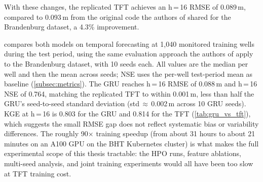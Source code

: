 With these changes, the replicated TFT achieves an h\,=\,16 RMSE of 0.089\,m,
compared to 0.093\,m from the original code the authors of \citet{kunz2025} shared
for the Brandenburg dataset, a 4.3\% improvement.

 compares both models on temporal forecasting at 1{,}040 monitored
training wells during the test period, using the same evaluation approach the authors of
\citet{kunz2025} apply to the Brandenburg dataset, with 10 seeds each. All values are
the median per well and then the mean across seeds; NSE uses the per-well test-period
mean as baseline (\cref{subsec:metrics}). The GRU reaches h\,=\,16 RMSE of 0.088\,m
and h\,=\,16 NSE of 0.764, matching the replicated TFT to within 0.001\,m, less than half
the GRU's seed-to-seed standard deviation (std\,$\approx$\,0.002\,m across 10 GRU seeds).
KGE at h\,=\,16 is 0.803 for the GRU and 0.814 for the TFT (\cref{tab:gru_vs_tft}),
which suggests the small RMSE gap does not reflect systematic bias or variability differences.
The roughly
90$\times$ training speedup (from about 31 hours to about 21 minutes on an A100 GPU on
the BHT Kubernetes cluster) is what makes the full experimental scope of this thesis
tractable: the HPO runs, feature ablations, multi-seed analysis, and joint training
experiments would all have been too slow at TFT training cost.

\begin{table}[htbp]
\centering
{}
\caption{GRU vs.\ TFT: temporal performance (avg = mean over h=1-16; $\Delta$\,=\,\% change in h=16 metric relative to Kunz TFT)}
\label{tab:gru_vs_tft}
\end{table}

